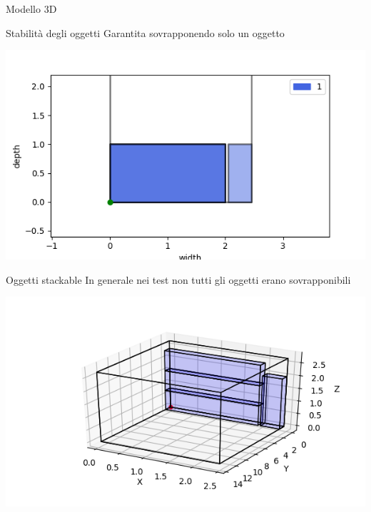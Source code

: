 \documentclass{beamer}
\begin{document}
\begin{frame}{Modello 3D}
	\begin{minipage}[c]{0.45\textwidth}
		\begin{alertblock}{Stabilit\`a degli oggetti}
			Garantita sovrapponendo solo un oggetto
		\end{alertblock}	
	\end{minipage}
	\hfill
	\begin{minipage}[c]{0.45\textwidth}
		\includegraphics[width=1\linewidth]{figures/3dg}
	\end{minipage}
							
	\begin{minipage}[c]{0.45\textwidth}
		\begin{alertblock}{Oggetti stackable}
			In generale nei test non tutti gli oggetti erano sovrapponibili
		\end{alertblock}	
	\end{minipage}
	\hfill
	\begin{minipage}[c]{0.45\textwidth}
		\includegraphics[width=1\linewidth]{figures/3d}
	\end{minipage}
\end{frame}
\end{document}
